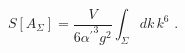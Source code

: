 \begin{equation}
S[A_\Sigma]=\frac{V}{6{\alpha^{\prime}}^3g^2} \int_\Sigma dk \,k^6\,\,.
\end{equation}

